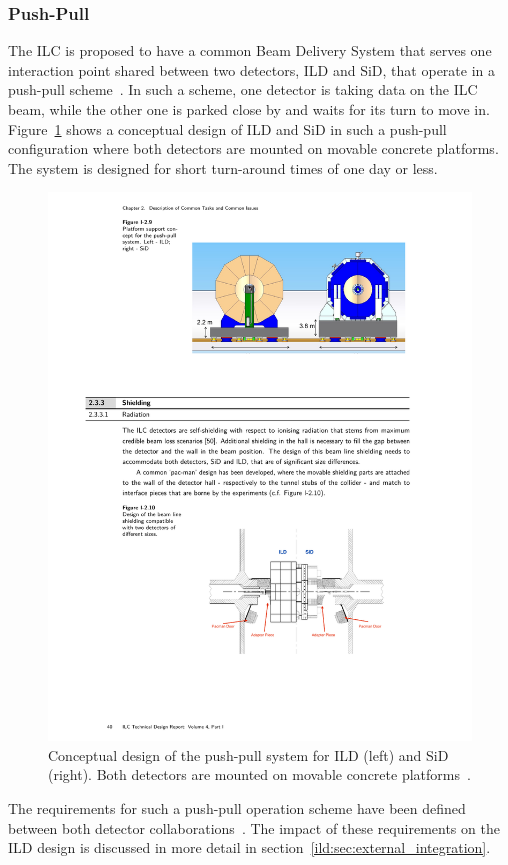 \subsubsection{Push-Pull}
The ILC is proposed to have a common Beam Delivery System that serves one interaction point shared between two detectors, ILD and SiD, that operate in a push-pull scheme~\cite{Behnke:2013xla}. In such a scheme, one detector is taking data on the ILC beam, while the other one is parked close by and waits for its turn to move in. Figure~\ref{ild:fig:push_pull} shows a conceptual design of ILD and SiD in such a push-pull configuration where both detectors are mounted on movable concrete platforms. The system is designed for short turn-around times of one day or less.
\begin{figure}[h!]
\centering
\includegraphics[width=0.8\hsize]{ILC/figs/push-pull.pdf}
\caption{\label{ild:fig:push_pull}Conceptual design of the push-pull system for ILD (left) and SiD (right). Both detectors are mounted on movable concrete platforms~\cite{Behnke:2013xla}.}
\end{figure}
The requirements for such a push-pull operation scheme have been defined between both detector collaborations~\cite{Parker:2009zz}. The impact of these requirements on the ILD design is discussed in more detail in section~\ref{ild:sec:external_integration}.


